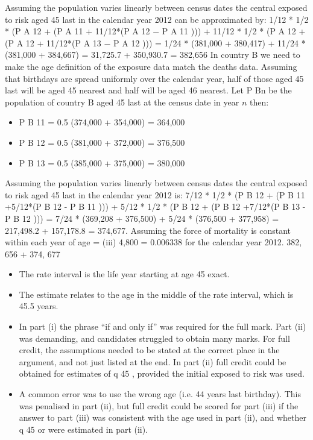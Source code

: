 \documentclass[a4paper,12pt]{article}
\begin{document}
\begin{enumerate}
Assuming the population varies linearly between census dates the central
exposed to risk aged 45 last in the calendar year 2012 can be approximated by:
1/12 * 1/2 * (P A 12 + (P A 11 + 11/12*(P A 12 − P A 11 ))) +
11/12 * 1/2 * (P A 12 + (P A 12 + 11/12*(P A 13 − P A 12 )))
= 1/24 * (381,000 + 380,417) + 11/24 * (381,000 + 384,667)
= 31,725.7 + 350,930.7
= 382,656
In country B we need to make the age definition of the exposure data match
the deaths data.
Assuming that birthdays are spread uniformly over the calendar year, half of those aged 45 last will be aged 45 nearest and half will be aged 46 nearest.
Let P Bn be the population of country B aged 45 last at the census date in year $n$ then:
\begin{itemize}
\item P B 11 = 0.5 (374,000 + 354,000) = 364,000
\item P B 12 = 0.5 (381,000 + 372,000) = 376,500
\item P B 13 = 0.5 (385,000 + 375,000) = 380,000
\end{itemize}

Assuming the population varies linearly between census dates the central
exposed to risk aged 45 last in the calendar year 2012 is:
7/12 * 1/2 * (P B 12 + (P B 11 +5/12*(P B 12 - P B 11 ))) +
5/12 * 1/2 * (P B 12 + (P B 12 +7/12*(P B 13 - P B 12 )))
= 7/24 * (369,208 + 376,500) + 5/24 * (376,500 + 377,958)
= 217,498.2 + 157,178.8
= 374,677.
Assuming the force of mortality is constant within each year of age
 =
(iii)
4,800
= 0.006338 for the calendar year 2012.
382, 656 + 374, 677


\begin{itemize}
\item The rate interval is the life year starting at age 45 exact.
\item The estimate relates to the age in the middle of the rate interval, which is 45.5
years.
\item In part (i) the phrase “if and only if” was required for the full mark. Part (ii) was demanding, and candidates struggled to obtain many marks. For full credit, the assumptions needed to be stated at the correct place in the argument, and not just listed at the end. In part (ii) full credit could be obtained for estimates of q 45 , provided the initial exposed to risk
was used.
\item A common error was to use the wrong age (i.e. 44 years last birthday). This was penalised in part (ii), but full credit could be scored for part (iii) if the answer to part (iii) was consistent
with the age used in part (ii), and whether q 45 or  were estimated in part (ii).
\end{itemize}


\end{enumerate}
\end{document}
